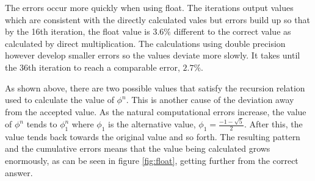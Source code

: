 \documentclass[11pt]{article} %
\begin{document}
		The errors occur more quickly when using float. The iterations output values which are consistent with the directly calculated vales but errors build up so that by the 16th iteration, the float value is $3.6\%$ different to the correct value as calculated by direct multiplication. The calculations using double precision however develop smaller errors so the values deviate more slowly. It takes until the 36th iteration to reach a comparable error, $2.7\%$.

		As shown above, there are two possible values that satisfy the recursion relation used to calculate the value of $\phi^n$. This is another cause of the deviation away from the accepted value. As the natural computational errors increase, the value of $\phi^n$ tends to $\phi_1^n$ where $\phi_1$ is the alternative value, $\phi_1 = \frac{-1-\sqrt{5}}{2}$. After this, the value tends back towards the original value and so forth. The resulting pattern and the cumulative errors means that the value being calculated grows enormously, as can be seen in figure \ref{fig:float}, getting further from the correct answer.
		\newpage
\end{document}
